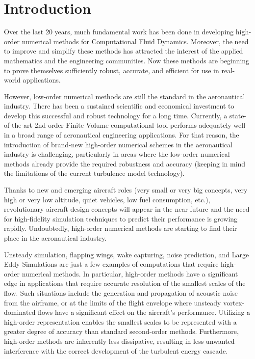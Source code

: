
\section{Introduction}

Over the last 20 years, much fundamental work has been done in developing high-order numerical methods for Computational Fluid Dynamics. Moreover, the need to improve and simplify these methods has attracted the interest of the applied mathematics and the engineering communities. Now these methods are beginning to prove themselves sufficiently robust, accurate, and efficient for use in real-world applications.

However, low-order numerical methods are still the standard in the aeronautical industry. There has been a sustained scientific and economical investment to develop this successful and robust technology for a long time. Currently, a state-of-the-art 2nd-order Finite Volume computational tool performs adequately well in a broad range of aeronautical engineering applications. For that reason, the introduction of brand-new high-order numerical schemes in the aeronautical industry is challenging, particularly in areas where the low-order numerical methods already provide the required robustness and accuracy (keeping in mind the limitations of the current turbulence model technology).

Thanks to new and emerging aircraft roles (very small or very big concepts, very high or very low altitude, quiet vehicles, low fuel consumption, etc.), revolutionary aircraft design concepts will appear in the near future and the need for high-fidelity simulation techniques to predict their performance is growing rapidly. Undoubtedly, high-order numerical methods are starting to find their place in the aeronautical industry. 

Unsteady simulation, flapping wings, wake capturing, noise prediction, and Large Eddy Simulations are just a few examples of computations that require high-order numerical methods. In particular, high-order methods have a significant edge in applications that require accurate resolution of the smallest scales of the flow. Such situations include the generation and propagation of acoustic noise from the airframe, or at the limits of the flight envelope where unsteady vortex-dominated flows have a significant effect on the aircraft's performance. Utilizing a high-order representation enables the smallest scales to be represented with a greater degree of accuracy than standard second-order methods. Furthermore, high-order methods are inherently less dissipative, resulting in less unwanted interference with the correct development of the turbulent energy cascade. 

